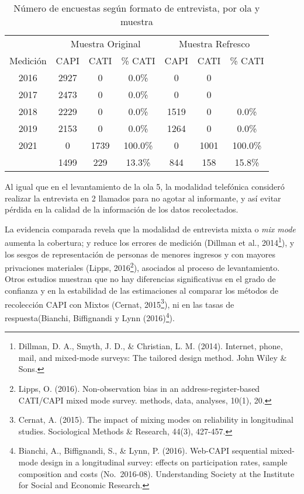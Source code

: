 \documentclass[
  12pt,
]{article}
\begin{document}
\begin{table}[H]

\caption{\label{tab:tabla-freq-mixmode}Número de encuestas según formato de entrevista, por ola y muestra}
\centering
\begin{tabular}[t]{ccccccc}
\toprule
\multicolumn{1}{c}{ } & \multicolumn{3}{c}{Muestra Original} & \multicolumn{3}{c}{Muestra Refresco} \\
\cmidrule(l{3pt}r{3pt}){2-4} \cmidrule(l{3pt}r{3pt}){5-7}
Medición & CAPI & CATI & \% CATI & CAPI & CATI & \% CATI\\
\midrule
2016 & 2927 & 0 & 0.0\% & 0 & 0 & \\
2017 & 2473 & 0 & 0.0\% & 0 & 0 & \\
2018 & 2229 & 0 & 0.0\% & 1519 & 0 & 0.0\%\\
2019 & 2153 & 0 & 0.0\% & 1264 & 0 & 0.0\%\\
2021 & 0 & 1739 & 100.0\% & 0 & 1001 & 100.0\%\\
\addlinespace
2022 & 1499 & 229 & 13.3\% & 844 & 158 & 15.8\%\\
\bottomrule
\end{tabular}
\end{table}

Al igual que en el levantamiento de la ola 5, la modalidad telefónica consideró realizar la entrevista en 2 llamados para no agotar al informante, y así evitar pérdida en la calidad de la información de los datos recolectados.

La evidencia comparada revela que la modalidad de entrevista mixta o \emph{mix mode} aumenta la cobertura; y reduce los errores de medición (Dillman et al., 2014\footnote{Dillman, D. A., Smyth, J. D., \& Christian, L. M. (2014). Internet, phone, mail, and mixed-mode surveys: The tailored design method. John Wiley \& Sons.}), y los sesgos de representación de personas de menores ingresos y con mayores privaciones materiales (Lipps, 2016\footnote{Lipps, O. (2016). Non-observation bias in an address-register-based CATI/CAPI mixed mode survey. methods, data, analyses, 10(1), 20.}), asociados al proceso de levantamiento. Otros estudios muestran que no hay diferencias significativas en el grado de confianza y en la estabilidad de las estimaciones al comparar los métodos de recolección CAPI con Mixtos (Cernat, 2015\footnote{Cernat, A. (2015). The impact of mixing modes on reliability in longitudinal studies. Sociological Methods \& Research, 44(3), 427-457.}), ni en las tasas de respuesta(Bianchi, Biffignandi y Lynn (2016)\footnote{Bianchi, A., Biffignandi, S., \& Lynn, P. (2016). Web-CAPI sequential mixed-mode design in a longitudinal survey: effects on participation rates, sample composition and costs (No.~2016-08). Understanding Society at the Institute for Social and Economic Research.}).
\end{document}
